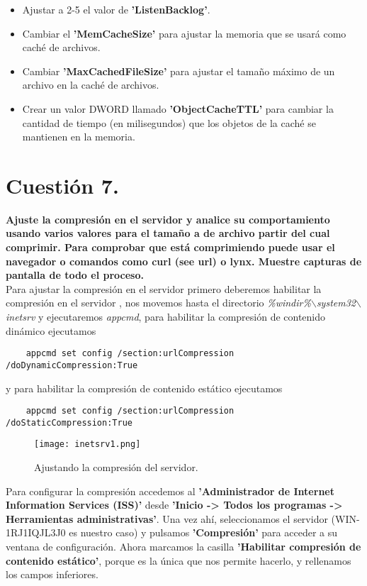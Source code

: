 \documentclass[a4paper, 10pt]{article} %
\begin{document}
\begin{itemize}
    \begin{itemize}
        \item Ajustar a 2-5 el valor de \textbf{'ListenBacklog'}.
        \item Cambiar el \textbf{'MemCacheSize'} para ajustar la memoria que se usará como caché de archivos.
        \item Cambiar \textbf{'MaxCachedFileSize'} para ajustar el tamaño máximo de un archivo en la caché de archivos.
        \item Crear un valor DWORD llamado \textbf{'ObjectCacheTTL'} para cambiar la cantidad de tiempo (en milisegundos) que los objetos de la caché se mantienen en la memoria.
    \end{itemize}
\end{itemize}

\pagebreak

\section{Cuestión 7.}
\textbf{Ajuste la compresión en el servidor y analice su comportamiento usando varios valores para el tamaño a de archivo partir
del cual comprimir. Para comprobar que está comprimiendo puede usar el navegador o comandos como curl (see url) o lynx. Muestre capturas de pantalla de todo el proceso.}\\

Para ajustar la compresión en el servidor primero deberemos habilitar la compresión en el servidor \cite{7}, nos movemos hasta el directorio \textit{\%windir\%$\backslash$system32$\backslash$inetsrv} y ejecutaremos \textit{appcmd}, para habilitar la compresión de contenido dinámico ejecutamos
\begin{verbatim}
    appcmd set config /section:urlCompression /doDynamicCompression:True
\end{verbatim}
 y para habilitar la compresión de contenido estático ejecutamos
\begin{verbatim}
    appcmd set config /section:urlCompression /doStaticCompression:True
\end{verbatim}

\begin{figure}[H]
\centering 
\texttt{[image: inetsrv1.png]} 
\caption{Ajustando la compresión del servidor.} 
\label{contexto:figura} 
\end{figure}

Para configurar la compresión accedemos al \textbf{'Administrador de Internet Information Services (ISS)'} desde \textbf{'Inicio -> Todos los programas -> Herramientas administrativas'}. Una vez ahí, seleccionamos el servidor (WIN-1RJ1IQJL3J0 es nuestro caso) y pulsamos \textbf{'Compresión'} para acceder a su ventana de configuración. Ahora marcamos la casilla \textbf{'Habilitar compresión de contenido estático'}, porque es la única que nos permite hacerlo, y rellenamos los campos inferiores.
\end{document}
